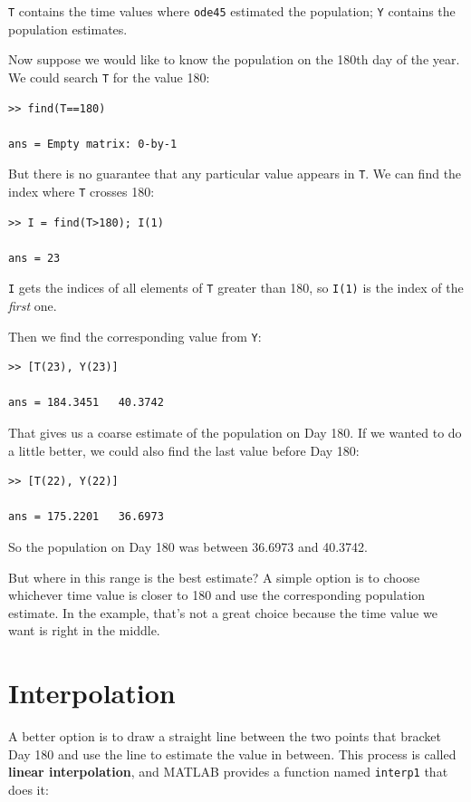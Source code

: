 \documentclass{book}
\begin{document}
{\tt T} contains the time values where {\tt ode45} estimated the
population; {\tt Y} contains the population estimates.

Now suppose we would like to know the population on the 180th day
of the year.  We could search {\tt T} for the value 180:

\begin{verbatim}
>> find(T==180)

ans = Empty matrix: 0-by-1
\end{verbatim}

But there is no guarantee that any particular value appears in
{\tt T}.  We can find the index where {\tt T} crosses 180:

\begin{verbatim}
>> I = find(T>180); I(1)

ans = 23
\end{verbatim}

{\tt I} gets the indices of all elements of {\tt T} greater
than 180, so {\tt I(1)} is the index of the {\em first} one.

Then we find the corresponding value from {\tt Y}:

\begin{verbatim}
>> [T(23), Y(23)]

ans = 184.3451   40.3742
\end{verbatim}

That gives us a coarse estimate of the population on Day 180.
If we wanted to do a little better, we could also find the last value
before Day 180:

\begin{verbatim}
>> [T(22), Y(22)]

ans = 175.2201   36.6973
\end{verbatim}

So the population on Day 180 was between 36.6973 and 40.3742.

But where in this range is the best estimate?  A simple option is to
choose whichever time value is closer to 180 and use the corresponding
population estimate.  In the example, that's not a great choice
because the time value we want is right in the middle.


\section{Interpolation}

A better option is to draw a straight line between the two points that
bracket Day 180 and use the line to estimate the value in between.
This process is called {\bf linear interpolation}, and MATLAB provides
a function named {\tt interp1} that does it:
\end{document}
